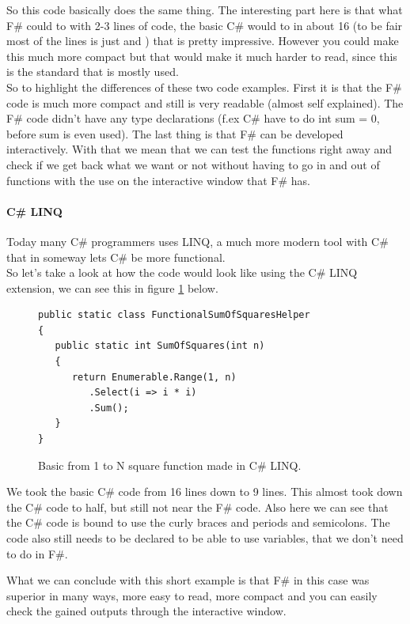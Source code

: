 \documentclass[12pt, a4paper]{article}
\begin{document}
So this code basically does the same thing. The interesting part here is that what F\# could to with 2-3 lines of code, the basic C\# would to in about 16 (to be fair most of the lines is just { and }) that is pretty impressive. However you could make this much more compact but that would make it much harder to read, since this is the standard that is mostly used.\\

So to highlight the differences of these two code examples. First it is that the F\# code is much more compact and still is very readable (almost self explained). The F\# code didn't have any type declarations (f.ex C\# have to do int sum = 0, before sum is even used). The last thing is that F\# can be developed interactively. With that we mean that we can test the functions right away and check if we get back what we want or not without having to go in and out of functions with the use on the interactive window that F\# has.

\newpage

\paragraph{C\# LINQ}
Today many C\# programmers uses LINQ, a much more modern tool with C\# that in someway lets C\# be more functional.\\

So let’s take a look at how the code would look like using the C\# LINQ extension, we can see this in figure \ref{fig:SquareFunctionCSharpLINQ} below.

\begin{figure}[!h]
\begin{lstlisting}
public static class FunctionalSumOfSquaresHelper
{
   public static int SumOfSquares(int n)
   {
      return Enumerable.Range(1, n)
         .Select(i => i * i)
         .Sum();
   }
}
\end{lstlisting}
\caption{Basic from 1 to N square function made in C\# LINQ.}
\label{fig:SquareFunctionCSharpLINQ}
\end{figure}

We took the basic C\# code from 16 lines down to 9 lines. This almost took down the C\# code to half, but still not near the F\# code. Also here we can see that the C\# code is bound to use the  curly braces and periods and semicolons. The code also still needs to be declared to be able to use variables, that we don’t need to do in F\#.

What we can conclude with this short example is that F\# in this case was superior in many ways, more easy to read, more compact and you can easily check the gained outputs through the interactive window. 
\end{document}
